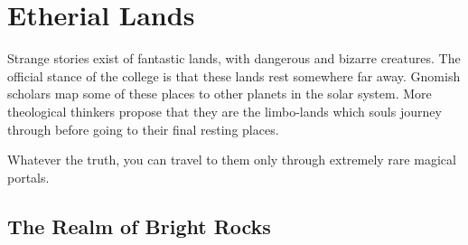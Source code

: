 \chapter{Etherial Lands}

Strange stories exist of fantastic lands, with dangerous and bizarre creatures.  The official stance of the \gls{college} is that these lands rest somewhere far away.
Gnomish scholars map some of these places to other planets in the solar system.
More theological thinkers propose that they are the limbo-lands which souls journey through before going to their final resting places.

Whatever the truth, you can travel to them only through extremely rare magical portals.

\section{The Realm of Bright Rocks}

